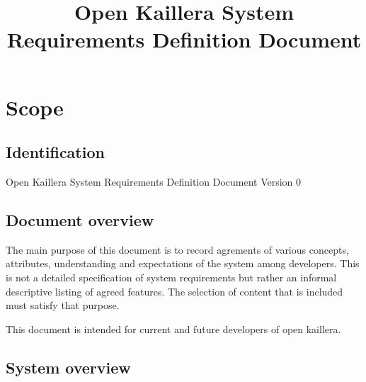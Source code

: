 \documentclass{article}
\begin{document}
\title{Open Kaillera System Requirements Definition Document}

\maketitle

\cleardoublepage

\tableofcontents


\cleardoublepage

\section{Scope}

\subsection{Identification}
Open Kaillera System Requirements Definition Document Version 0




\subsection{Document overview}

The main purpose of this document is to record agrements of various
 concepts, attributes, understanding and expectations of the system among
 developers. This is not a detailed specification of system requirements but
 rather an informal descriptive listing of agreed features. The selection of
 content that is included must satisfy that purpose.

This document is intended for current and future developers of open kaillera.


\subsection{System overview}
\end{document}
